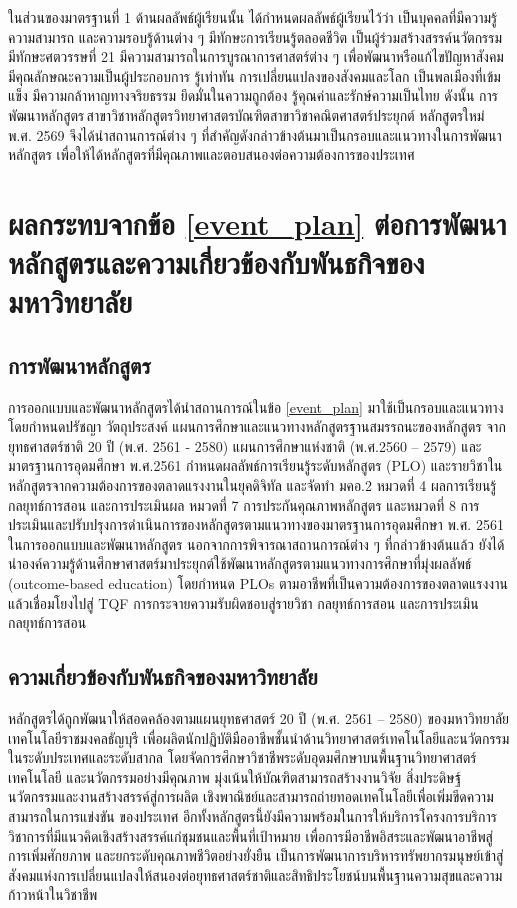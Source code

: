 {ในส่วนของมาตรฐานที่ 1 ด้านผลลัพธ์ผู้เรียนนั้น ได้กำหนดผลลัพธ์ผู้เรียนไว้ว่า        เป็นบุคคลที่มีความรู้ ความสามารถ และความรอบรู้ด้านต่าง ๆ มีทักษะการเรียนรู้ตลอดชีวิต เป็นผู้ร่วมสร้างสรรค์นวัตกรรม มีทักษะศตวรรษที่ 21 มีความสามารถในการบูรณาการศาสตร์ต่าง ๆ เพื่อพัฒนาหรือแก้ไขปัญหาสังคม มีคุณลักษณะความเป็นผู้ประกอบการ รู้เท่าทัน     การเปลี่ยนแปลงของสังคมและโลก เป็นพลเมืองที่เข้มแข็ง มีความกล้าหาญทางจริยธรรม    ยึดมั่นในความถูกต้อง รู้คุณค่าและรักษ์ความเป็นไทย
ดังนั้น การพัฒนาหลักสูตร\thdegree\,สาขาวิชา\thdegreebranch หลักสูตรวิทยาศาสตรบัณฑิตสาขาวิชาคณิตศาสตร์ประยุกต์ หลักสูตรใหม่ พ.ศ. 2569 จึงได้นำสถานการณ์ต่าง ๆ ที่สำคัญดังกล่าวข้างต้นมาเป็นกรอบและแนวทางในการพัฒนาหลักสูตร เพื่อให้ได้หลักสูตรที่มีคุณภาพและตอบสนองต่อความต้องการของประเทศ
\section{ผลกระทบจากข้อ \ref{event_plan} ต่อการพัฒนาหลักสูตรและความเกี่ยวข้องกับพันธกิจของมหาวิทยาลัย}
\subsection{การพัฒนาหลักสูตร}
การออกแบบและพัฒนาหลักสูตรได้นำสถานการณ์ในข้อ \ref{event_plan} มาใช้เป็นกรอบและแนวทาง โดยกำหนดปรัชญา วัตถุประสงค์ แผนการศึกษาและแนวทางหลักสูตรฐานสมรรถนะของหลักสูตร จากยุทธศาสตร์ชาติ 20 ปี (พ.ศ. 2561 - 2580) แผนการศึกษาแห่งชาติ        (พ.ศ.2560 – 2579) และมาตรฐานการอุดมศึกษา พ.ศ.2561 กำหนดผลลัพธ์การเรียนรู้ระดับหลักสูตร (PLO) และรายวิชาในหลักสูตรจากความต้องการของตลาดแรงงานในยุคดิจิทัล และจัดทำ มคอ.2 หมวดที่ 4 ผลการเรียนรู้ กลยุทธ์การสอน และการประเมินผล หมวดที่ 7 การประกันคุณภาพหลักสูตร และหมวดที่ 8 การประเมินและปรับปรุงการดำเนินการของหลักสูตรตามแนวทางของมาตรฐานการอุดมศึกษา พ.ศ. 2561
ในการออกแบบและพัฒนาหลักสูตร นอกจากการพิจารณาสถานการณ์ต่าง ๆ ที่กล่าวข้างต้นแล้ว ยังได้นำองค์ความรู้ด้านศึกษาศาสตร์มาประยุกต์ใช้พัฒนาหลักสูตรตามแนวทางการศึกษาที่มุ่งผลลัพธ์ (outcome-based education) โดยกำหนด PLOs ตามอาชีพที่เป็นความต้องการของตลาดแรงงาน แล้วเชื่อมโยงไปสู่ TQF การกระจายความรับผิดชอบสู่รายวิชา กลยุทธ์การสอน และการประเมินกลยุทธ์การสอน 
\subsection{ความเกี่ยวข้องกับพันธกิจของมหาวิทยาลัย}
หลักสูตรได้ถูกพัฒนาให้สอดคล้องตามแผนยุทธศาสตร์ 20 ปี (พ.ศ. 2561 – 2580) ของมหาวิทยาลัยเทคโนโลยีราชมงคลธัญบุรี เพื่อผลิตนักปฏิบัติมืออาชีพชั้นนำด้านวิทยาศาสตร์เทคโนโลยีและนวัตกรรมในระดับประเทศและระดับสากล โดยจัดการศึกษาวิชาชีพระดับอุดมศึกษาบนพื้นฐานวิทยาศาสตร์เทคโนโลยี และนวัตกรรมอย่างมีคุณภาพ มุ่งเน้นให้บัณฑิตสามารถสร้างงานวิจัย สิ่งประดิษฐ์ นวัตกรรมและงานสร้างสรรค์สู่การผลิต เชิงพาณิชย์และสามารถถ่ายทอดเทคโนโลยีเพื่อเพิ่มขีดความสามารถในการแข่งขัน           ของประเทศ อีกทั้งหลักสูตรนี้ยังมีความพร้อมในการให้บริการโครงการบริการวิชาการที่มีแนวคิดเชิงสร้างสรรค์แก่ชุมชนและพื้นที่เป้าหมาย เพื่อการมีอาชีพอิสระและพัฒนาอาชีพสู่ การเพิ่มศักยภาพ และยกระดับคุณภาพชีวิตอย่างยั่งยืน เป็นการพัฒนาการบริหารทรัพยากรมนุษย์เข้าสู่สังคมแห่งการเปลี่ยนแปลงให้สนองต่อยุทธศาสตร์ชาติและสิทธิประโยชน์บนพื้นฐานความสุขและความก้าวหน้าในวิชาชีพ
}
